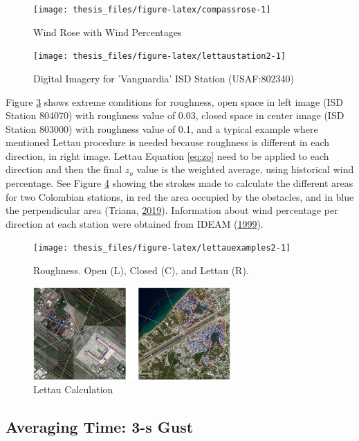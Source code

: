 \documentclass[12pt,oneside]{reedthesis}
\begin{document}
\begin{figure}

{\centering \texttt{[image: thesis\_files/figure-latex/compassrose-1]} 

}

\caption{Wind Rose with Wind Percentages}\label{fig:compassrose}
\end{figure}
\footnotesize
\begin{figure}

{\centering \texttt{[image: thesis\_files/figure-latex/lettaustation2-1]} 

}

\caption{Digital Imagery for 'Vanguardia' ISD Station (USAF:802340)}\label{fig:lettaustation2}
\end{figure}
\normalsize

Figure \ref{fig:lettauexamples2} shows extreme conditions for roughness, open space in left image (ISD Station 804070) with roughness value of 0.03, closed space in center image (ISD Station 803000) with roughness value of 0.1, and a typical example where mentioned Lettau procedure is needed because roughness is different in each direction, in right image. Lettau Equation \eqref{eq:zo} need to be applied to each direction and then the final \(z_o\) value is the weighted average, using historical wind percentage. See Figure \ref{fig:lettauvalues} showing the strokes made to calculate the different areas for two Colombian stations, in red the area occupied by the obstacles, and in blue the perpendicular area (Triana, \protect\hyperlink{ref-triana2019}{2019}). Information about wind percentage per direction at each station were obtained from IDEAM (\protect\hyperlink{ref-ideam1999}{1999}).
\begin{figure}

{\centering \texttt{[image: thesis\_files/figure-latex/lettauexamples2-1]} 

}

\caption{Roughness. Open (L), Closed (C), and Lettau (R).}\label{fig:lettauexamples2}
\end{figure}
\begin{figure}

{\centering \includegraphics[width=2.97in]{figure/lettauvalues} 

}

\caption{Lettau Calculation}\label{fig:lettauvalues}
\end{figure}
\hypertarget{rmd-gust}{%
\subsection{Averaging Time: 3-s Gust}\label{rmd-gust}}
\end{document}
